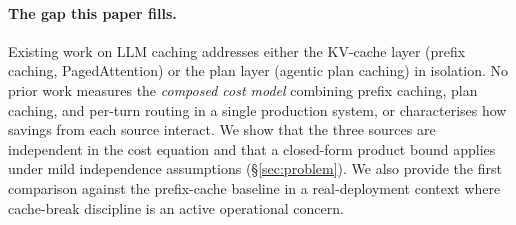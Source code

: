 \paragraph{The gap this paper fills.}
Existing work on LLM caching addresses either the KV-cache
layer (prefix caching, PagedAttention) or the plan layer
(agentic plan caching) in isolation. No prior work measures the
\emph{composed cost model} combining prefix caching, plan caching,
and per-turn routing in a single production system, or
characterises how savings from each source interact. We show that
the three sources are independent in the cost equation and that a
closed-form product bound applies under mild independence
assumptions (\S\ref{sec:problem}). We also provide the first
comparison against the prefix-cache baseline in a real-deployment
context where cache-break discipline is an active operational
concern.
